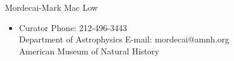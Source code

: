 \documentclass[10pt]{article}
\newenvironment{innerlist}[1][\enskip\textbullet]%
        {\begin{itemize}[#1,leftmargin=*,parsep=0pt,itemsep=0pt,topsep=0pt,partopsep=0pt]}
        {\end{itemize}}
\newcommand{\halfblankline}{\quad\vspace{-0.5\baselineskip}\pagebreak[3]}
\begin{document}
\halfblankline

Mordecai-Mark Mac Low
\begin{innerlist}
\item[] Curator \hfill {Phone: 212-496-3443}\\
Department of Astrophysics \hfill{E-mail: mordecai@amnh.org}\\
American Museum of Natural History
\end{innerlist}
%
%
%
%
\end{document}
